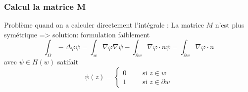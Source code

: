 \begin{frame}
\frametitle{Calcul la matrice M}
Probl\`eme quand on a calculer directement l'int\'egrale : La matrice $M$ n'est plus sym\'etrique 
=> solution: formulation faiblement
\begin{equation}
\int_\Omega -\Delta\varphi \psi =\int_w \nabla\varphi\nabla\psi - \int_{\partial w} \nabla\varphi\cdot n \psi =\int_{\partial w} \nabla\varphi\cdot n 
\end{equation}
avec $\psi \in H(w)$ satifait 
\begin{equation}
\psi(z) =
\begin{cases}
0 \qquad \text{ si } z\in w \\
1 \qquad \text{ si } z\in \partial w
\end{cases}
\end{equation} 


\end{frame} 
